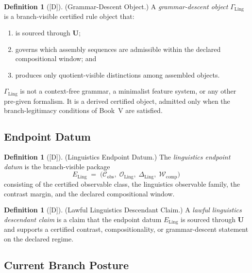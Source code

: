 \documentclass[12pt,oneside]{amsbook}
\theoremstyle{plain}
\theoremstyle{definition}
\newtheorem{definition}[theorem]{Definition}
\theoremstyle{remark}
\newcommand{\status}[1]{\textup{[#1]}}
\begin{document}
\begin{definition}[\status{D}]\label{def:ling-grammar-descent}
\textup{(Grammar-Descent Object.)}
A \emph{grammar-descent object} $\Gamma_{\mathrm{Ling}}$ is a
branch-visible certified rule object that:
\begin{enumerate}[label=\textup{(\arabic*)}]
 \item is sourced through $\mathbf{U}$;
 \item governs which assembly sequences are admissible within the
 declared compositional window; and
 \item produces only quotient-visible distinctions among assembled
 objects.
\end{enumerate}
$\Gamma_{\mathrm{Ling}}$ is not a context-free grammar, a minimalist
feature system, or any other pre-given formalism. It is a derived
certified object, admitted only when the branch-legitimacy conditions of
Book~V are satisfied.
\end{definition}

\subsection{Endpoint Datum}\label{sec:ling-endpoint}

\begin{definition}[\status{D}]\label{def:ling-endpoint}
\textup{(Linguistics Endpoint Datum.)}
The \emph{linguistics endpoint datum} is the branch-visible package
\[
 E_{\mathrm{Ling}} \;=\;
 \bigl(\mathcal{C}_{\mathrm{obs}},\;
 \mathcal{O}_{\mathrm{Ling}},\;
 \Delta_{\mathrm{Ling}},\;
 \mathcal{W}_{\mathrm{comp}}\bigr)
\]
consisting of the certified observable class, the linguistics
observable family, the contrast margin, and the declared compositional
window.
\end{definition}

\begin{definition}[\status{D}]\label{def:lawful-ling-descendant}
\textup{(Lawful Linguistics Descendant Claim.)}
A \emph{lawful linguistics descendant claim} is a claim that the
endpoint datum $E_{\mathrm{Ling}}$ is sourced through $\mathbf{U}$ and
supports a certified contrast, compositionality, or grammar-descent
statement on the declared regime.
\end{definition}

\subsection{Current Branch Posture}\label{sec:ling-posture}
\end{document}
